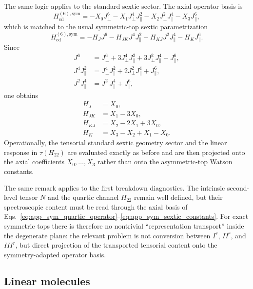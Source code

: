 \documentclass[journal=jacsat,manuscript=article]{achemso}
\begin{document}
The same logic applies to the standard sextic sector. The axial operator basis
is
\begin{equation}
H_{\mathrm{cd}}^{(6),\mathrm{sym}}
=
-X_0 J_{\perp}^6
-X_1 J_{\perp}^4 J_{\parallel}^2
-X_2 J_{\perp}^2 J_{\parallel}^4
-X_3 J_{\parallel}^6,
\label{eq:app_sym_sextic_operator}
\end{equation}
which is matched to the usual symmetric-top sextic parametrization
\begin{equation}
H_{\mathrm{cd}}^{(6),\mathrm{sym}}
=
-H_J J^6
-H_{JK} J^4 J_{\parallel}^2
-H_{KJ} J^2 J_{\parallel}^4
-H_K J_{\parallel}^6.
\end{equation}
Since
\begin{align}
J^6 &= J_{\perp}^6 + 3J_{\perp}^4J_{\parallel}^2
+ 3J_{\perp}^2J_{\parallel}^4 + J_{\parallel}^6, \\
J^4J_{\parallel}^2
&=
J_{\perp}^4J_{\parallel}^2
+ 2J_{\perp}^2J_{\parallel}^4
+ J_{\parallel}^6, \\
J^2J_{\parallel}^4
&=
J_{\perp}^2J_{\parallel}^4 + J_{\parallel}^6,
\end{align}
one obtains
\begin{align}
H_J &= X_0, \\
H_{JK} &= X_1 - 3X_0, \\
H_{KJ} &= X_2 - 2X_1 + 3X_0, \\
H_K &= X_3 - X_2 + X_1 - X_0.
\label{eq:app_sym_sextic_constants}
\end{align}
Operationally, the tensorial standard sextic geometry sector and the linear
response in $\tau(H_{22})$ are evaluated exactly as before and are then
projected onto the axial coefficients $X_0,\ldots,X_3$ rather than onto the
asymmetric-top Watson constants.

The same remark applies to the first breakdown diagnostics. The intrinsic
second-level tensor $N$ and the quartic channel $H_{22}$ remain well defined,
but their spectroscopic content must be read through the axial basis of
Eqs.~\eqref{eq:app_sym_quartic_operator}--\eqref{eq:app_sym_sextic_constants}.
For exact symmetric tops there is therefore no nontrivial
``representation transport'' inside the degenerate plane: the relevant problem
is not conversion between $I^r$, $II^r$, and $III^r$, but direct projection of
the transported tensorial content onto the symmetry-adapted operator basis.

\subsection{Linear molecules}
\end{document}
